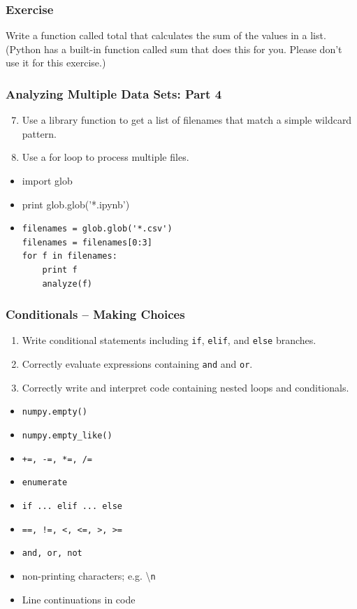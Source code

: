 \documentclass[xcolor=dvipsnames]{beamer}
\begin{document}
\begin{frame}
\frametitle{Exercise}
Write a function called total that calculates the sum of the values in a list. (Python has a built-in function called sum that does this for you. Please don't use it for this exercise.)
\end{frame}

\begin{frame}[fragile]
\frametitle{Analyzing Multiple Data Sets: Part 4}
\begin{enumerate}
\setcounter{enumi}{6}
\item     Use a library function to get a list of filenames that match a simple wildcard pattern.
\item    Use a for loop to process multiple files.
\end{enumerate}
\begin{itemize}
\item import glob
\item print glob.glob('*.ipynb')
\item
\begin{verbatim}
filenames = glob.glob('*.csv')
filenames = filenames[0:3]
for f in filenames:
    print f
    analyze(f)
\end{verbatim}
\end{itemize}
\end{frame}


\begin{frame}
\frametitle{Conditionals -- Making Choices}
\begin{enumerate}
  \item Write conditional statements including {\tt if}, {\tt elif}, and {\tt else} branches.
  \item Correctly evaluate expressions containing {\tt and} and {\tt or}.
  \item Correctly write and interpret code containing nested loops and conditionals.
\end{enumerate}
\begin{multicols}{2}
\begin{itemize}
  \item {\tt numpy.empty()}
  \item {\tt numpy.empty\_like()}
  \item {\tt +=, -=, *=, /=}
  \item {\tt enumerate}
  \item {\tt if ... elif ... else}
  \item {\tt ==, !=, <, <=, >, >=}
  \item {\tt and, or, not}
  \item non-printing characters; e.g. \textbackslash{\tt n}
  \item Line continuations in code
\end{itemize}
\end{multicols}
\end{frame}
\end{document}
